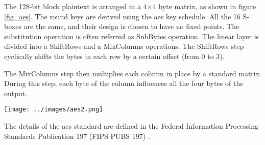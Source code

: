 \documentclass[11pt]{sdm}
\begin{document}
The 128-bit block plaintext is arranged in a 4$\times$4 byte matrix, as shown in figure \ref{fig_aes}.
The round keys are derived using the \gls{aes} key schedule.
All the 16 S-boxes are the same, and their design is chosen to have no fixed points.
The substitution operation is often referred as SubBytes operation.
The linear layer is divided into a ShiftRows and a MixColumns operations.
The ShiftRows step cyclically shifts the bytes in each row by a certain offset (from 0 to 3).


The MixColumns step then multiplies each column in place by a standard matrix.
During this step, each byte of the column influences all the four bytes of the output.

\begin{center}
    \texttt{[image: ../images/aes2.png]}
    \captionsetup{hypcap=false}
    \label{fig_aes}
\end{center}

The details of the \gls{aes} standard are defined in the Federal Information Processing Standards Publication 197 (FIPS PUBS 197) \parencite{Standards2001}.
\end{document}
